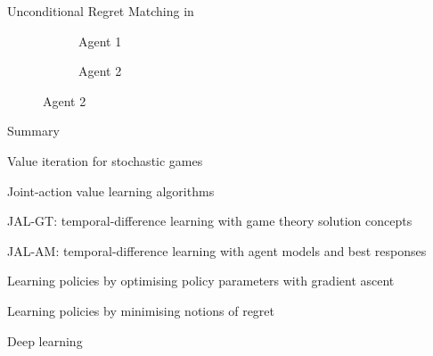 \begin{frame}{Unconditional Regret Matching in \rps}
    \begin{figure}[t]
	\begin{subfigure}[t]{0.48\textwidth}
		\caption{Agent 1}
	\end{subfigure}
	\hfill
	\begin{subfigure}[t]{0.48\textwidth}
		\caption{Agent 2}
	\end{subfigure}
    \end{figure}
\end{frame}

\begin{frame}{Summary}
    \blist
        \item Value iteration for stochastic games
        \item Joint-action value learning algorithms
        \blisttab
            \item JAL-GT: temporal-difference learning with game theory solution concepts
            \item JAL-AM: temporal-difference learning with agent models and best responses
        \elisttab
        \item Learning policies by optimising policy parameters with gradient ascent
        \item Learning policies by minimising notions of regret
    \elist

    \blist
        \item Deep learning
    \elist
\end{frame}


